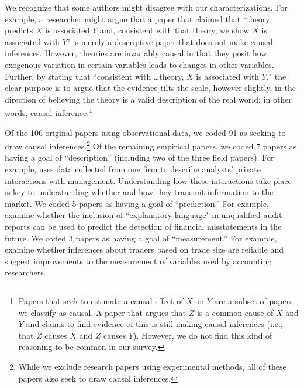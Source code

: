 \documentclass[12pt,reqno,titlepage]{amsart}
\begin{document}
\begin{doublespace}
We recognize that some authors might disagree with our characterizations.
For example, a researcher might argue that a paper that claimed that ``theory predicts $X$ is associated $Y$ and, consistent with that theory, we show $X$ is associated with $Y$" is merely a descriptive paper that does not make causal inferences.
However, theories are invariably causal in that they posit how exogenous variation in certain variables leads to changes in other variables.
Further, by stating that ``consistent with \dots theory, $X$ is associated with $Y$," the clear purpose is to argue that the evidence tilts the scale, however slightly, in the direction of believing the theory is a valid description of the real world: in other words, causal inference.\footnote{
Papers that seek to estimate a causal effect of $X$ on $Y$ are a subset of papers we classify as causal.
A paper that argues that $Z$ is a common cause of $X$ and $Y$ and claims to find evidence of this is still making causal inferences (i.e., that $Z$ causes $X$ and $Z$ causes $Y$).
However, we do not find this kind of reasoning to be common in our survey.}

Of the 106 original papers using observational data, we coded 91 as seeking to draw causal inferences.\footnote{While we exclude research papers using experimental methods, all of these papers also seek to draw causal inferences.}
Of the remaining empirical papers, we coded 7 papers as having a goal of ``description'' (including two of the three field papers). 
For example, \citet{Soltes:2013ba} uses data collected from one firm to describe analysts' private interactions with management. Understanding how these interactions take place is key to understanding whether and how they transmit information to the market.
We coded 5 papers as having a goal of ``prediction.'' 
For example, \citet{Czerney:2014bv} examine whether the inclusion of ``explanatory language" in unqualified audit reports can be used to predict the detection of financial misstatements in the future.
We coded 3 papers as having a goal of ``measurement.'' 
For example, \citet{Cready:2014ji} examine whether inferences about traders based on trade size are reliable and suggest improvements to the measurement of variables used by accounting researchers.


\end{doublespace}
\end{document}
